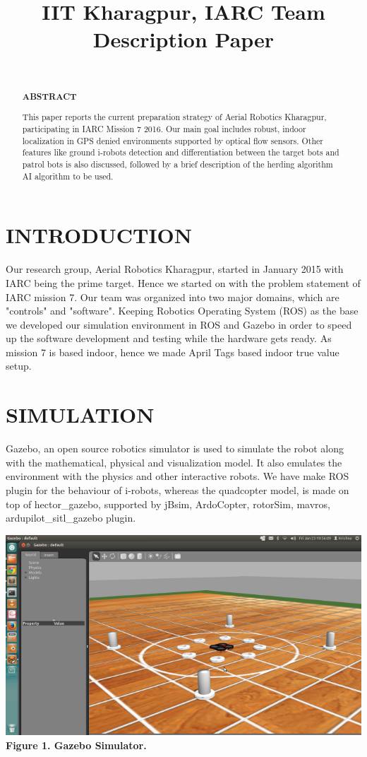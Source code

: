 \documentclass[12pt]{article}
\title{IIT Kharagpur, IARC Team Description Paper}
\begin{document}
\maketitle
\begin{abstract}
\\
\begin{center}\textbf{ABSTRACT}\end{center}
This paper reports the current preparation strategy of Aerial Robotics Kharagpur,
participating in IARC Mission 7 2016. Our main goal includes robust, indoor 
localization in GPS denied environments supported by optical flow sensors. 
Other features like ground i-robots detection and differentiation between the 
target bots and patrol bots is also discussed, followed by a brief description 
of the herding algorithm AI algorithm to be used.
\end{abstract}


\section{INTRODUCTION}
Our research group, Aerial Robotics Kharagpur, started in January 2015 with IARC 
being the prime target. Hence we started on with the problem statement of IARC 
mission 7. Our team was organized into two major domains, which are "controls" 
and "software". Keeping Robotics Operating System (ROS) as the base we developed 
our simulation environment in ROS and Gazebo in order to speed up the software 
development and testing while the hardware gets ready. As mission 7 is based 
indoor, hence we made April Tags based indoor true value setup.

\section{SIMULATION}
Gazebo, an open source robotics simulator is used to simulate the robot along with 
the mathematical, physical and visualization model. It also emulates the environment 
with the physics and other interactive robots. We have make ROS plugin for the behaviour 
of i-robots, whereas the quadcopter model,
is made on top of hector\_gazebo, supported by jBsim, ArdoCopter, rotorSim, mavros,
ardupilot\_sitl\_gazebo plugin.

\begin{center}\includegraphics[scale=0.5]{image23} \\
\textbf{Figure 1. Gazebo Simulator.}\end{center}
\end{document}
